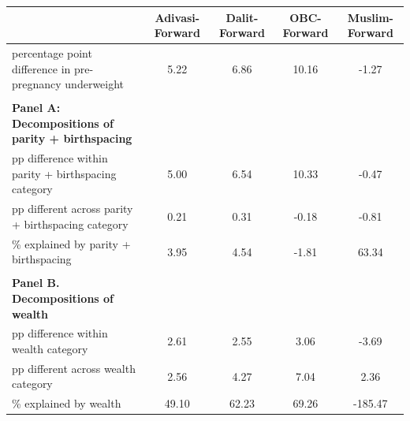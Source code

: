 \begin{tabular}{l*{4}{c}}
\toprule
            &\multicolumn{1}{c}{Adivasi-Forward}&\multicolumn{1}{c}{Dalit-Forward}&\multicolumn{1}{c}{OBC-Forward}&\multicolumn{1}{c}{Muslim-Forward}\\
\midrule
\midrule
percentage point difference in pre-pregnancy underweight&        5.22&        6.86&       10.16&       -1.27\\
            &            &            &            &            \\
\textbf{Panel A: Decompositions of parity + birthspacing}&            &            &            &            \\
pp difference within parity + birthspacing category&        5.00&        6.54&       10.33&       -0.47\\
pp different across parity + birthspacing category&        0.21&        0.31&       -0.18&       -0.81\\
\% explained by parity + birthspacing&        3.95&        4.54&       -1.81&       63.34\\
            &            &            &            &            \\
\textbf{Panel B. Decompositions of wealth}&            &            &            &            \\
pp difference within wealth category&        2.61&        2.55&        3.06&       -3.69\\
pp different across wealth category&        2.56&        4.27&        7.04&        2.36\\
\% explained by wealth&       49.10&       62.23&       69.26&     -185.47\\
\bottomrule
\end{tabular}
